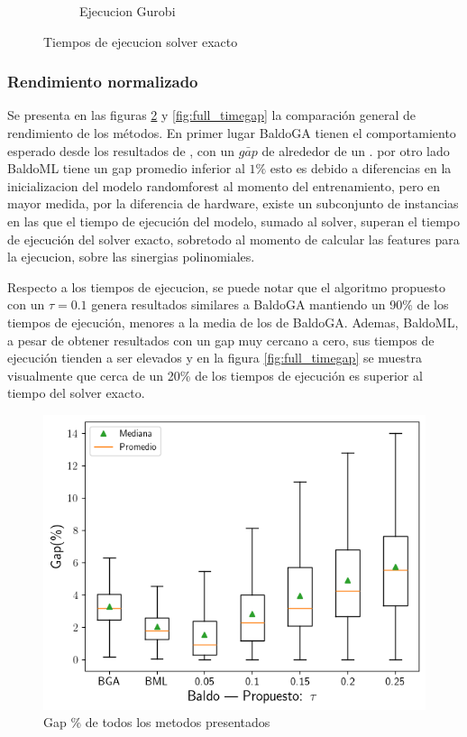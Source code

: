 \documentclass[spanish, a4paper, 12pt, openany,final]{book}
\begin{document}
\begin{figure}[h]
\begin{subfigure}{.5\textwidth}
		\caption{Ejecucion Gurobi }
	\end{subfigure}%
	\caption{Tiempos de ejecucion solver exacto}
	\label{fig:solver_times}
\end{figure}

\subsubsection*{Rendimiento normalizado}
Se presenta en las figuras \ref{fig:full_gap} y \ref{fig:full_timegap} la comparación general de rendimiento de los métodos. En primer lugar BaldoGA tienen el comportamiento esperado desde los resultados de \cite{baldo_polynomial_2023}, con un $\bar{gap}$ de alrededor de un 
. por otro lado BaldoML tiene un gap promedio inferior al $1\%$ esto es debido a diferencias en la inicializacion del modelo randomforest al momento del entrenamiento, pero en mayor medida, por la diferencia de hardware, existe un subconjunto de instancias en las que el tiempo de ejecución del modelo, sumado al solver, superan el tiempo de ejecución del solver exacto, sobretodo al momento de calcular las features para la ejecucion, sobre las sinergias polinomiales.

Respecto a los tiempos de ejecucion, se puede notar que el algoritmo propuesto con un $\tau = 0.1$ genera resultados similares a BaldoGA mantiendo un 90\% de los tiempos de ejecución, menores a la media de los de BaldoGA. Ademas, BaldoML, a pesar de obtener resultados con un gap muy cercano a cero, sus tiempos de ejecución tienden a ser elevados y en la figura \ref{fig:full_timegap} se muestra visualmente que cerca de un 20\% de los tiempos de ejecución es superior al tiempo del solver exacto.


\begin{figure}[H]
	\centering
	\includegraphics[scale=0.7]{graphs/full_gap_comparison.png}
	\caption{Gap \% de todos los metodos presentados}
	\label{fig:full_gap}
\end{figure}
\end{document}
